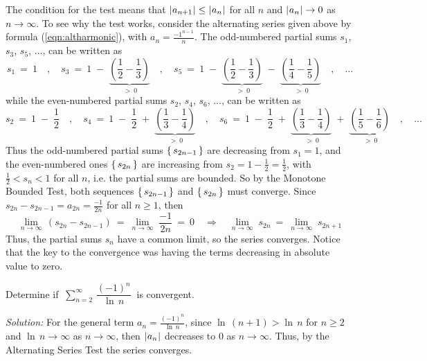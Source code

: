 
\noindent The condition for the test means that $\lvert\mspace{1mu}a_{n+1}\mspace{1mu}\rvert \le \lvert\mspace{1mu}a_n\mspace{1mu}\rvert$
for all $n$ and $\lvert\mspace{1mu}a_n\mspace{1mu}\rvert \rightarrow 0$ as $n \rightarrow \infty$. To see why
the test works, consider the alternating series given above by formula
(\ref{eqn:altharmonic}), with $a_n=\frac{-1^{n-1}}{n}$. The odd-numbered partial
sums $s_1$, $s_3$, $s_5$, $\ldots$, can be written as
\[
s_1 ~=~ 1 \quad,\quad
s_3 ~=~ 1 \;-\; \underbrace{\left(\frac{1}{2} - \frac{1}{3}\right)}_{~>~ 0} \quad,\quad
s_5 ~=~ 1 \;-\; \underbrace{\left(\frac{1}{2} - \frac{1}{3}\right)}_{~>~ 0} \;-\; 
        \underbrace{\left(\frac{1}{4} - \frac{1}{5}\right)}_{~>~ 0} \quad,\quad\ldots
\]
while the even-numbered partial sums $s_2$, $s_4$, $s_6$, $\ldots$, can be
written as
\[
s_2 ~=~ 1 \;-\; \frac{1}{2} \quad,\quad
s_4 ~=~ 1 \;-\; \frac{1}{2} \;+\; \underbrace{\left(\frac{1}{3} - \frac{1}{4}\right)}_{~>~ 0} \quad,\quad
s_6 ~=~ 1 \;-\; \frac{1}{2} \;+\; \underbrace{\left(\frac{1}{3} - \frac{1}{4}\right)}_{~>~ 0} \;+\; 
        \underbrace{\left(\frac{1}{5} - \frac{1}{6}\right)}_{~>~ 0} \quad,\quad\ldots
\]
Thus the odd-numbered partial sums $\left\lbrace\mspace{3mu}s_{2n-1}\mspace{3mu}\right\rbrace$ are decreasing from $s_1=1$,
and the even-numbered ones $\left\lbrace\mspace{3mu}s_{2n}\mspace{3mu}\right\rbrace$ are increasing from
$s_2=1-\frac{1}{2}=\frac{1}{2}$, with $\frac{1}{2} < s_n < 1$ for all $n$, i.e. the
partial sums are bounded. So by the Monotone Bounded Test, both sequences
$\left\lbrace\mspace{3mu}s_{2n-1}\mspace{3mu}\right\rbrace$ and $\left\lbrace\mspace{3mu}s_{2n}\mspace{3mu}\right\rbrace$ must converge. Since
$s_{2n} - s_{2n-1} = a_{2n} = \frac{-1}{2n}$ for all $n \ge 1$, then
\[
\lim_{n \to \infty} \,(s_{2n} - s_{2n-1}) ~=~ \lim_{n \to \infty} \;\frac{-1}{2n} ~=~ 0
\quad\Rightarrow\quad \lim_{n \to \infty} \;s_{2n} ~=~ \lim_{n \to \infty} \;s_{2n+1}
\]
Thus, the partial sums $s_n$ have a common limit, so the series converges.
Notice that the key to the convergence was having the terms decreasing in
absolute value to zero.
\newpage
\begin{exmp}
\noindent Determine if
$~\displaystyle\sum_{n=2}^{\infty} \,\dfrac{(-1)^{n}}{\ln \,n}~$ is
convergent.\vspace{1mm}
\par\noindent\emph{Solution:} For the general term
$a_n = \frac{(-1)^{n}}{\ln \,n}$, since $\ln\,(n+1) > \ln\,n$ for $n\ge 2$ and
$\ln\,n \rightarrow \infty$ as $n \rightarrow \infty$, then $\lvert\mspace{1mu}a_n\mspace{1mu}\rvert$
decreases to 0 as $n \rightarrow \infty$. Thus, by the Alternating Series Test
the series converges.
\end{exmp}
\divider
\vspace{2mm}

